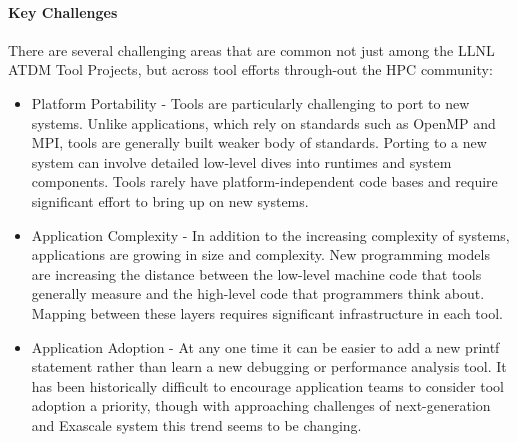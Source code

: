 \paragraph{Key Challenges}
There are several challenging areas that are common not just among the LLNL ATDM Tool Projects, but across tool efforts through-out the HPC community:
\begin{itemize}
\itemsep 0em
\item Platform Portability - Tools are particularly challenging to port to new systems.  Unlike applications, which rely on standards such as OpenMP and MPI, tools are generally built weaker body of standards.  Porting to a new system can involve detailed low-level dives into runtimes and system components.  Tools rarely have platform-independent code bases and require significant effort to bring up on new systems.  
\item Application Complexity - In addition to the increasing complexity of systems, applications are growing in size and complexity.  New programming models are increasing the distance between the low-level machine code that tools generally measure and the high-level code that programmers think about.  Mapping between these layers requires significant infrastructure in each tool.
\item Application Adoption - At any one time it can be easier to add a new printf statement rather than learn a new debugging or performance analysis tool.  It has been historically difficult to encourage application teams to consider tool adoption a priority, though with approaching challenges of next-generation and Exascale system this trend seems to be changing.
\end{itemize}

